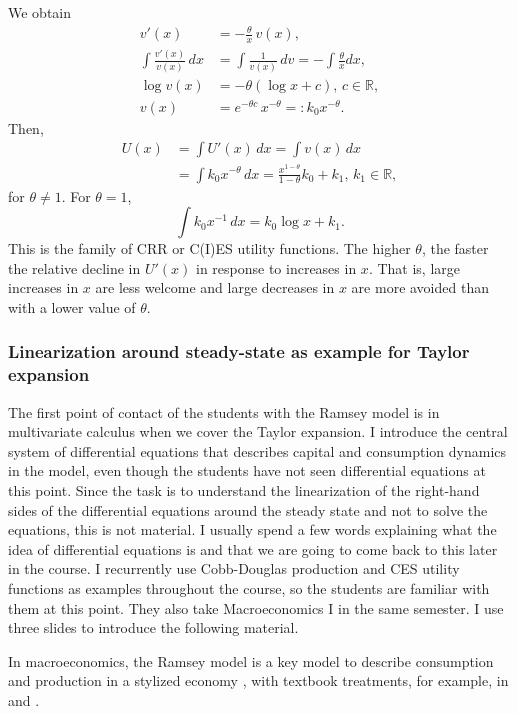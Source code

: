 \documentclass[graybox]{svmult}
\newcommand{\R}{\mathds{R}}
\begin{document}
We obtain
    \begin{align*}
        v'(x) &= -\frac{\theta}{x}\, v(x),\\
        \int \frac{v'(x)}{v(x)}\, dx &= \int \frac{1}{v(x)}\, dv = -\int \frac{\theta}{x} dx,\\
        \log v(x) &= - \theta(\log x + c),\, c\in\R,\\
        v(x) &= e^{-\theta c}\, x^{-\theta} =: k_0 x^{-\theta}.
    \end{align*}
    Then,
    \begin{align*}
        U(x) &= \int U'(x) \, dx = \int v(x)\, dx\\
         &= \int k_0 x^{-\theta}\, dx = \frac{x^{1-\theta}}{1-\theta}k_0  + k_1,\, k_1\in\R,
    \end{align*}
    for $\theta\neq 1$.  For $\theta =1$,
    \[
        \int k_0 x^{-1}\, dx = k_0 \log x + k_1.
    \]
    This is the family of CRR or C(I)ES utility functions.  The higher $\theta$, the faster the relative decline in $U'(x)$ in response to increases in $x$.  That is, large increases in $x$ are less welcome and large decreases in $x$ are more avoided than with a lower value of $\theta$.




\subsubsection{Linearization around steady-state as example for Taylor expansion}

The first point of contact of the students with the Ramsey model is in multivariate calculus when we cover the Taylor expansion. I introduce the central system of differential equations that describes capital and consumption dynamics in the model, even though the students have not seen differential equations at this point. Since the task is to understand the linearization of the right-hand sides of the differential equations around the steady state and not to solve the equations, this is not material. I usually spend a few words explaining what the idea of differential equations is and that we are going to come back to this later in the course. I recurrently use Cobb-Douglas production and CES utility functions as examples throughout the course, so the students are familiar with them at this point. They also take Macroeconomics I in the same semester. I use three slides to introduce the following material.

In macroeconomics, the Ramsey model is a key model to describe consumption and production in a stylized economy \citep{Ramsey1928,Koopmans1963,Cass1965}, with textbook treatments, for example, in \cite{Barro2004} and \cite{Romer2006}.
\end{document}
